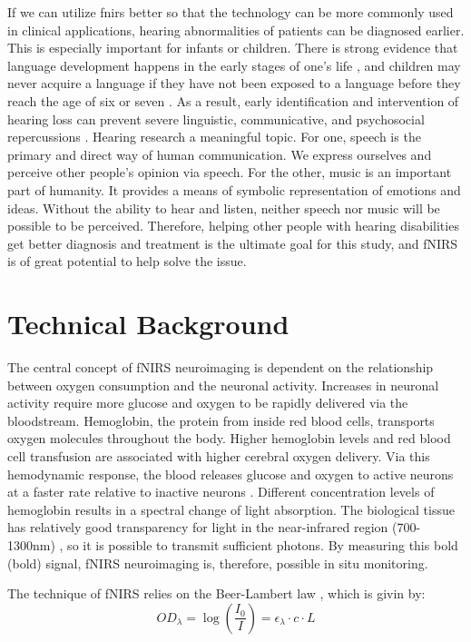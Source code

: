 If we can utilize \acrshort{fnirs} better so that the technology can be more commonly used in clinical applications, hearing abnormalities of patients can be diagnosed earlier. This is especially important for infants or children. There is strong evidence that language development happens in the early stages of one's life \citep {Elissa1990}, and children may never acquire a language if they have not been exposed to a language before they reach the age of six or seven \citep {clark2000first}. As a result, early identification and intervention of hearing loss can prevent severe linguistic, communicative, and psychosocial repercussions \citep {Robinshaw1995} \citep {Yoshinaga1998}. Hearing research a meaningful topic. For one, speech is the primary and direct way of human communication. We express ourselves and perceive other people's opinion via speech. For the other, music is an important part of humanity. It provides a means of symbolic representation of emotions and ideas. Without the ability to hear and listen, neither speech nor music will be possible to be perceived. Therefore, helping other people with hearing disabilities get better diagnosis and treatment is the ultimate goal for this study, and fNIRS is of great potential to help solve the issue.

\section{Technical Background}
The central concept of fNIRS neuroimaging is dependent on the relationship between oxygen consumption and the neuronal activity. Increases in neuronal activity require more glucose and oxygen to be rapidly delivered via the bloodstream. Hemoglobin, the protein from inside red blood cells, transports oxygen molecules throughout the body. Higher hemoglobin levels and red blood cell transfusion are associated with higher cerebral oxygen delivery. Via this hemodynamic response, the blood releases glucose and oxygen to active neurons at a faster rate relative to inactive neurons \citep {Pelphrey2013}. Different concentration levels of hemoglobin results in a spectral change of light absorption. The biological tissue has relatively good transparency for light in the near-infrared region (700-1300nm) \citep{doi:10.1126/science.929199}, so it is possible to transmit sufficient photons. By measuring this \acrlong{bold} (\acrshort{bold}) signal, fNIRS neuroimaging is, therefore, possible in situ monitoring.

\newpage
The technique of fNIRS relies on the Beer-Lambert law \citep{ BeerLambert}, which is givin by:
\begin{equation} 
OD_{\lambda} = \log \left(\frac {I_0}{I}\right) = \epsilon _{\lambda} \cdot c \cdot L
\end{equation}

